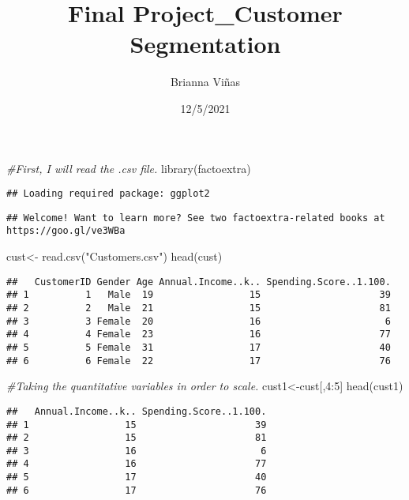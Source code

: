 \documentclass[
]{article}
\title{Final Project\_Customer Segmentation}
\author{Brianna Viñas}
\date{12/5/2021}
\newenvironment{Shaded}{\begin{snugshade}}{\end{snugshade}}
\newcommand{\CommentTok}[1]{\textcolor[rgb]{0.56,0.35,0.01}{\textit{#1}}}
\newcommand{\DecValTok}[1]{\textcolor[rgb]{0.00,0.00,0.81}{#1}}
\newcommand{\FunctionTok}[1]{\textcolor[rgb]{0.00,0.00,0.00}{#1}}
\newcommand{\NormalTok}[1]{#1}
\newcommand{\OtherTok}[1]{\textcolor[rgb]{0.56,0.35,0.01}{#1}}
\newcommand{\SpecialCharTok}[1]{\textcolor[rgb]{0.00,0.00,0.00}{#1}}
\newcommand{\StringTok}[1]{\textcolor[rgb]{0.31,0.60,0.02}{#1}}
\begin{document}
\maketitle

\begin{Shaded}
\begin{Highlighting}[]
\CommentTok{\#First, I will read the .csv file. }
\FunctionTok{library}\NormalTok{(factoextra)}
\end{Highlighting}
\end{Shaded}

\begin{verbatim}
## Loading required package: ggplot2
\end{verbatim}

\begin{verbatim}
## Welcome! Want to learn more? See two factoextra-related books at https://goo.gl/ve3WBa
\end{verbatim}

\begin{Shaded}
\begin{Highlighting}[]
\NormalTok{cust}\OtherTok{\textless{}{-}} \FunctionTok{read.csv}\NormalTok{(}\StringTok{"Customers.csv"}\NormalTok{)}
\FunctionTok{head}\NormalTok{(cust)}
\end{Highlighting}
\end{Shaded}

\begin{verbatim}
##   CustomerID Gender Age Annual.Income..k.. Spending.Score..1.100.
## 1          1   Male  19                 15                     39
## 2          2   Male  21                 15                     81
## 3          3 Female  20                 16                      6
## 4          4 Female  23                 16                     77
## 5          5 Female  31                 17                     40
## 6          6 Female  22                 17                     76
\end{verbatim}

\begin{Shaded}
\begin{Highlighting}[]
\CommentTok{\#Taking the quantitative variables in order to scale. }
\NormalTok{cust1}\OtherTok{\textless{}{-}}\NormalTok{cust[,}\DecValTok{4}\SpecialCharTok{:}\DecValTok{5}\NormalTok{]}
\FunctionTok{head}\NormalTok{(cust1)}
\end{Highlighting}
\end{Shaded}

\begin{verbatim}
##   Annual.Income..k.. Spending.Score..1.100.
## 1                 15                     39
## 2                 15                     81
## 3                 16                      6
## 4                 16                     77
## 5                 17                     40
## 6                 17                     76
\end{verbatim}
\end{document}
